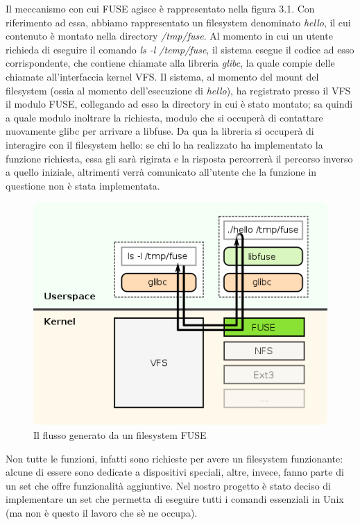 Il meccanismo con cui FUSE agisce è rappresentato nella figura 3.1. Con riferimento ad essa, abbiamo rappresentato un filesystem denominato \emph{hello}, il cui contenuto è montato nella directory \emph{/tmp/fuse}. Al momento in cui un utente richieda di eseguire il comando \emph{ls -l /temp/fuse}, il sistema esegue il codice ad esso corrispondente, che contiene chiamate alla libreria \emph{glibc}, la quale compie delle chiamate all'interfaccia kernel VFS. Il sistema, al momento del mount del filesystem (ossia al momento dell'esecuzione di \emph{hello}), ha registrato presso il VFS il modulo FUSE, collegando ad esso la directory in cui è stato montato; sa quindi a quale modulo inoltrare la richiesta, modulo che si occuperà di contattare nuovamente glibc per arrivare a libfuse. Da qua la libreria si occuperà di interagire con il filesystem hello: se chi lo ha realizzato ha implementato la funzione richiesta, essa gli sarà rigirata e la risposta percorrerà il percorso inverso a quello iniziale, altrimenti verrà comunicato all'utente che la funzione in questione non è stata implementata. 
\begin{figure}
\centering
\includegraphics[scale=0.5]{./fuse.png}
\caption{Il flusso generato da un filesystem FUSE}
\label{fig:1}
\end{figure}

Non tutte le funzioni, infatti sono richieste per avere un filesystem funzionante: alcune di essere sono dedicate a dispositivi speciali, altre, invece, fanno parte di un set che offre funzionalità aggiuntive. Nel nostro progetto è stato deciso di implementare un set che permetta di eseguire tutti i comandi essenziali in Unix (ma non è questo il lavoro che sè ne occupa).

